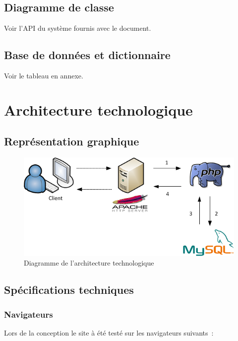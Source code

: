 \documentclass[letter, 11pt]{report}
\begin{document}
\section{Diagramme de classe}

Voir l'API du système fournis avec le document.

\section{Base de données et dictionnaire}

Voir le tableau en annexe.

\chapter{Architecture technologique}

\section{Représentation graphique}

\begin{figure}[htbp]
	\begin{center}
		\includegraphics[scale=0.75]{architectureTechnologique.png}
	\end{center}
	\caption{Diagramme de l'architecture technologique}
\end{figure}

\section{Spécifications techniques}


\subsection{Navigateurs}
Lors de la conception le site à été testé sur les navigateurs suivants~:
\end{document}
